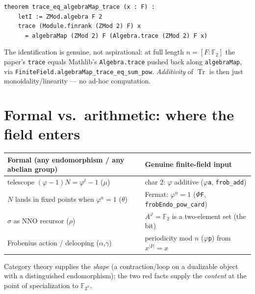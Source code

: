 \documentclass[11pt]{article}
\newcommand{\lc}[1]{\texttt{\small #1}}
\newcommand{\Tr}{\operatorname{Tr}}
\newcommand{\Fq}{\mathbb{F}_{2^{n}}}
\begin{document}
\begin{lstlisting}
theorem trace_eq_algebraMap_trace (x : F) :
    letI := ZMod.algebra F 2
    trace (Module.finrank (ZMod 2) F) x
      = algebraMap (ZMod 2) F (Algebra.trace (ZMod 2) F x)
\end{lstlisting}

\begin{note}
The identification is genuine, not aspirational: at full length
$n=[F:\mathbb{F}_2]$ the paper's \lc{trace} equals Mathlib's \lc{Algebra.trace}
pushed back along \lc{algebraMap}, via \lc{FiniteField.algebraMap\_trace\_eq\_sum\_pow}.
\emph{Additivity} of $\Tr$ is then just monoidality/linearity --- no ad-hoc
computation.
\end{note}

\section{Formal vs.\ arithmetic: where the field enters}

\begin{center}\small
\renewcommand{\arraystretch}{1.3}
\begin{tabular}{@{}p{7.2cm}p{7.4cm}@{}}
\hline
\textbf{Formal (any endomorphism / any abelian group)} &
\textbf{Genuine finite-field input} \\
\hline
telescope $(\varphi-1)N=\varphi^{\ell}-1$ (\lc{$\mu$}) &
  \textcolor{cInp}{char $2$: $\varphi$ additive} (\lc{$\varphi$a}, \lc{frob\_add})\\
$N$ lands in fixed points when $\varphi^{n}=1$ (\lc{$\theta$}) &
  \textcolor{cInp}{Fermat: $\varphi^{n}=1$} (\lc{$\Phi$F}, \lc{frobEndo\_pow\_card})\\
$\sigma$ as NNO recursor (\lc{$\rho$}) &
  \textcolor{cInp}{$A^{\varphi}=\mathbb{F}_2$ is a two-element set (the bit)}\\
Frobenius action / delooping (\lc{$\alpha$},\lc{$\gamma$}) &
  periodicity mod $n$ (\lc{$\varphi$p}) from $x^{|F|}=x$\\
\hline
\end{tabular}
\end{center}

Category theory supplies the \emph{shape} (a contraction/loop on a dualizable
object with a distinguished endomorphism); the two red facts supply the
\emph{content} at the point of specialization to $\Fq$.

\end{document}
